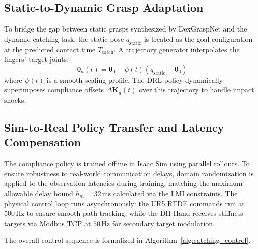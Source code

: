 \documentclass[letterpaper,journal]{IEEEtran}
\begin{document}
\subsection{Static-to-Dynamic Grasp Adaptation}
To bridge the gap between static grasps synthesized by DexGraspNet and the dynamic catching task, the static pose $q_{\text{static}}$ is treated as the goal configuration at the predicted contact time $T_{\text{catch}}$. A trajectory generator interpolates the fingers' target joints:
\begin{equation}
\boldsymbol{\theta}_d(t) = \boldsymbol{\theta}_0 + \psi(t) (q_{\text{static}} - \boldsymbol{\theta}_0)
\end{equation}
where $\psi(t)$ is a smooth scaling profile. The DRL policy dynamically superimposes compliance offsets $\Delta \mathbf{K}_a(t)$ over this trajectory to handle impact shocks.

\subsection{Sim-to-Real Policy Transfer and Latency Compensation}
The compliance policy is trained offline in Isaac Sim using parallel rollouts. To ensure robustness to real-world communication delays, domain randomization is applied to the observation latencies during training, matching the maximum allowable delay bound $h_m = 32\,\text{ms}$ calculated via the LMI constraints. The physical control loop runs asynchronously: the UR5 RTDE commands run at $500\,\text{Hz}$ to ensure smooth path tracking, while the DH Hand receives stiffness targets via Modbus TCP at $50\,\text{Hz}$ for secondary target modulation.

The overall control sequence is formalized in Algorithm~\ref{alg:catching_control}.
\end{document}
